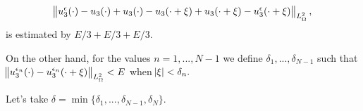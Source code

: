 \documentclass[11pt]{article}
\begin{document}
$$\norm{u_3^{\epsilon}(\cdot) - u_3(\cdot) + u_3(\cdot) - u_3(\cdot + \xi) + u_3(\cdot + \xi) - u_3^{\epsilon}(\cdot + \xi)}_{L^2_\Omega},$$ is estimated by $ E / 3 + E / 3 + E / 3. $

On the other hand, for the values $n = 1, ... , N-1$ we define $\delta_1, ..., \delta_{N-1}$ such that $\norm{u_3^{\epsilon_n}(\cdot) - u_3^{\epsilon_n}(\cdot + \xi)}_{L^2_\Omega} < E$ when $\abs{\xi} < \delta_n.$

Let's take $\delta = \min{\{\delta_1, ... , \delta_{N-1}, \delta_N\}}.$
\end{document}
